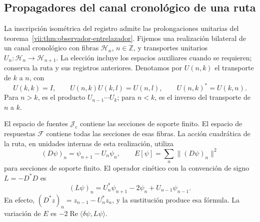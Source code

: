 \subsection{Propagadores del canal cronológico de una ruta}
\label{vii:subsec:green-cronologico}

La inscripción isométrica del registro admite las prolongaciones unitarias
del teorema~\ref{vii:thm:observador-entrelazador}. Fijemos una realización
bilateral de un canal cronológico con fibras \(\mathcal H_n\),
\(n\in\mathbb Z\), y transportes unitarios
\(U_n:\mathcal H_n\to\mathcal H_{n+1}\).
La elección incluye los espacios auxiliares cuando se requieren; conserva
la ruta y sus registros anteriores. Denotamos por \(U(n,k)\) el transporte
de \(k\) a \(n\), con
\[
 U(k,k)=I,\qquad U(n,k)U(k,l)=U(n,l),\qquad
 U(n,k)^*=U(k,n).
\]
Para \(n>k\), es el producto \(U_{n-1}\cdots U_k\); para \(n<k\),
es el inverso del transporte de \(n\) a \(k\).

El espacio de fuentes \(\mathcal J_c\) contiene las secciones de soporte
finito. El espacio de respuestas \(\mathcal F\) contiene todas las
secciones de esas fibras. La acción cuadrática de la ruta, en unidades
internas de esta realización, utiliza
\[
 (D\psi)_n=\psi_{n+1}-U_n\psi_n,\qquad
 E[\psi]=\sum_n\|(D\psi)_n\|^2
\]
para secciones de soporte finito. El operador cinético con la convención
de signo \(L=-D^*D\) es
\begin{equation}
 (L\psi)_n=U_n^*\psi_{n+1}-2\psi_n+U_{n-1}\psi_{n-1}.
 \label{vii:eq:diferencia-covariante-bidireccional}
\end{equation}
En efecto, \((D^*z)_n=z_{n-1}-U_n^*z_n\), y la sustitución produce
esa fórmula. La variación de \(E\) es
\(-2\operatorname{Re}\langle\delta\psi,L\psi\rangle\).


